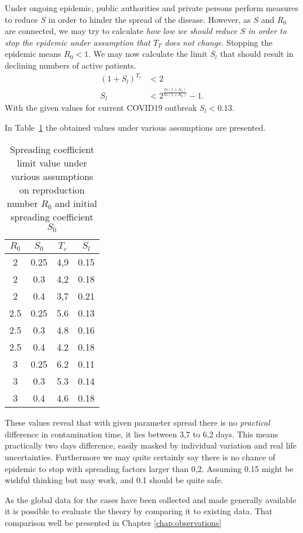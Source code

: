 Under ongoing epidemic, public authorities and private persons perform
measures to reduce $S$ in order to hinder the spread of the disease. However,
as $S$ and $R_0$ are connected, we may try to calculate \emph{how low we should
reduce $S$ in order to stop the epidemic under assumption that $T_T$ does not
change}. Stopping the epidemic means $R_0< 1$. We may now calculate the limit
$S_l$ that should result in declining numbers of active patients.
\begin{align}
    \left(1+S_l\right)^{T_c}&<2\\
    S_l&<2^{\frac{ln\left(1+S_0\right)}{ln\left(1+R_0\right)}}-1.
\end{align}
With the given values for current COVID19 outbreak $S_l<0.13$. 

In Table~\ref{tab:variants} the obtained values under various assumptions are
presented.
\begin{table}[h!]
  \begin{center}
      \caption{Spreading coefficient limit value under various assumptions on
      reproduction number $R_0$ and initial spreading coefficient $S_0$}
    \label{tab:variants}
    \begin{tabular}{c|c|c|c} %
        \textbf{$R_0$} & \textbf{$S_0$} & \textbf{$T_c$} & \textbf{$S_l$}\\
      \hline
      2 &0.25&4,9&0.15 \\
      2 &0.3&4,2&0.18\\
      2 &0.4&3,7&0.21\\
      2.5&0.25&5.6&0.13\\
      2.5&0.3&4.8&0.16\\
      2.5&0.4&4.2&0.18\\
      3 &0.25&6.2&0.11\\
      3 &0.3&5.3&0.14\\
      3 &0.4&4.6&0.18\\
    \end{tabular}
  \end{center}
\end{table}
These values reveal that with given parameter spread there is no
\emph{practical} difference in contamination time, it lies between 3,7 to 6,2
days. This means practically two days difference, easily masked by individual
variation and real life uncertainties. 
Furthermore we may quite
certainly say there is no chance of epidemic to stop with spreading factors
larger than 0,2. Assuming 0.15 might be wishful thinking but may work, and 0.1 should be
quite safe. 

As the global data for the cases have been collected and made generally
available it is possible to evaluate the theory by comparing it to
existing data. That comparison well be presented in Chapter
\ref{chap:observations}

